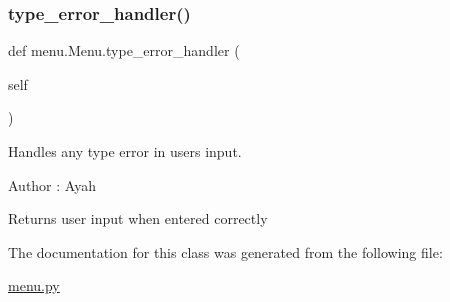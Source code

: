 \subsubsection{\texorpdfstring{type\+\_\+error\+\_\+handler()}{type\_error\_handler()}}
{\footnotesize\ttfamily def menu.\+Menu.\+type\+\_\+error\+\_\+handler (\begin{DoxyParamCaption}\item[{}]{self }\end{DoxyParamCaption})}



Handles any type error in users input. 

\begin{DoxyAuthor}{Author}
\+: Ayah 
\end{DoxyAuthor}
\begin{DoxyReturn}{Returns}
user input when entered correctly 
\end{DoxyReturn}


The documentation for this class was generated from the following file\+:\begin{DoxyCompactItemize}
\item 
\mbox{\hyperlink{menu_8py}{menu.\+py}}\end{DoxyCompactItemize}
